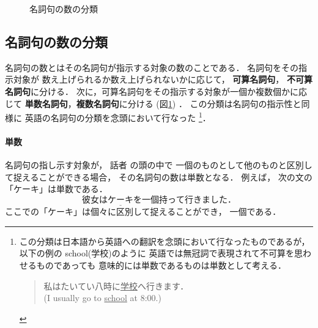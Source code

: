 \begin{figure}[t]
\small
\begin{center}
  \caption{名詞句の数の分類}
  \label{fig:suu_bunrui}
  \end{center}
\end{figure}

\subsection{名詞句の数の分類}
名詞句の数とはその名詞句が指示する対象の数のことである．
名詞句をその指示対象が
数え上げられるか数え上げられないかに応じて，
{\bf 可算名詞句}，
{\bf 不可算名詞句}に分ける．
次に，可算名詞句をその指示する対象が一個か複数個かに応じて
{\bf 単数名詞句}，{\bf 複数名詞句}に分ける
(図\ref{fig:suu_bunrui})
．
この分類は名詞句の指示性と同様に
英語の名詞句の分類を念頭において行なった
\footnote{
    この分類は日本語から英語への翻訳を念頭において行なったものであるが，
    以下の例の school(学校)のように
    英語では無冠詞で表現されて不可算を思わせるものであっても
    意味的には単数であるものは単数として考える．
    \begin{quote}
    私はたいてい八時に\underline{学校}へ行きます．\\
    (I usually go to \underline{school} at 8:00.)
    \end{quote}
}．



\paragraph{単数}
名詞句の指し示す対象が，
話者
の頭の中で
一個のものとして他のものと区別して捉えることができる場合，
その名詞句の数は単数となる．
例えば，
次の文の「ケーキ」は単数である．
\begin{equation}
彼女は\underline{ケーキ}を一個持って行きました．
\end{equation}
ここでの「ケーキ」は個々に区別して捉えることができ，
一個である．


